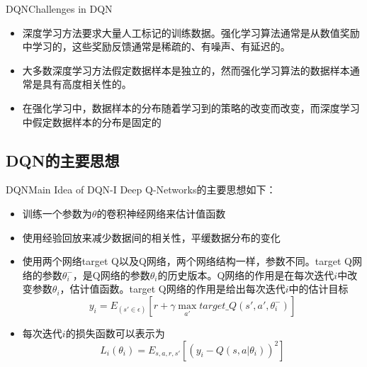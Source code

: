 \documentclass[10pt]{beamer}
\begin{document}
	\begin{frame}{DQN}{Challenges in DQN}
		\begin{itemize}
			\item<2-> 深度学习方法要求大量人工标记的训练数据。强化学习算法通常是从数值奖励中学习的，这些奖励反馈通常是稀疏的、有噪声、有延迟的。
			
			\item<3-> 大多数深度学习方法假定数据样本是独立的，然而强化学习算法的数据样本通常是具有高度相关性的。
			
			\item<4-> 在强化学习中，数据样本的分布随着学习到的策略的改变而改变，而深度学习中假定数据样本的分布是固定的
			
		\end{itemize}
	\end{frame}

	\subsection{DQN的主要思想}

	\begin{frame}{DQN}{Main Idea of DQN-I}
		Deep Q-Networks\cite{Hasselt16:DQN}的主要思想如下：
		\begin{itemize}
			\item<2-> 训练一个参数为$\theta$的卷积神经网络来估计值函数
			
			\item<3-> 使用经验回放来减少数据间的相关性，平缓数据分布的变化
			
			\item<4-> 使用两个网络target Q以及Q网络，两个网络结构一样，参数不同。target Q网络的参数$\theta_i^-$，是Q网络的参数$\theta_i$的历史版本。Q网络的作用是在每次迭代$i$中改变参数$\theta_i$，估计值函数。target Q网络的作用是给出每次迭代$i$中的估计目标
			\[y_i = E_(s' \in \epsilon)[r + \gamma \max_{a'} target\_Q(s',a',\theta_i^-)] \]
			
			\item<5-> 每次迭代$i$的损失函数可以表示为
			\[L_i(\theta_i) = E_{s,a,r,s'}[(y_i - Q(s,a| \theta_i))^2] \]
			
		\end{itemize}
	\end{frame}
\end{document}
